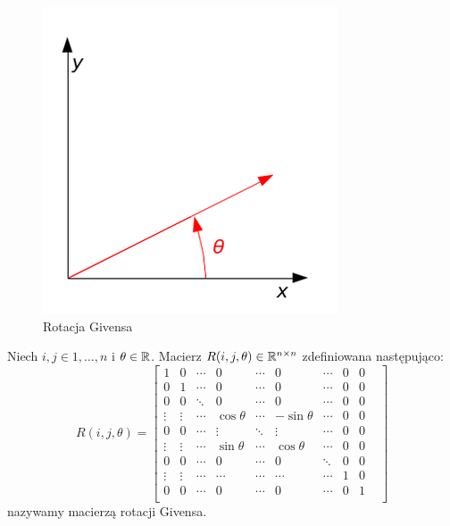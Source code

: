 \documentclass[12pt,a4paper]{report}
\newcommand{\mx}[1]{{#1}}
\begin{document}
\begin{figure}
\centering
\includegraphics[width=\linewidth]{rys/givens_rot.png}
\caption{Rotacja Givensa}\label{rys:logo:jeden}
\end{figure}

\begin{definition}
Niech $ i,j \in {1, \ldots, n}$ i $\theta \in \mathbb{R}$. Macierz $\mx{R}(i,j,\theta) \in \setR^{n\times n}$ zdefiniowana następująco:
$$
\mx{R}(i,j,\theta) = \begin{bmatrix}
1       & 0     & \cdots &    0       & \cdots &    0       & \cdots & 0 & 0& \\
0       & 1     & \cdots &     0      & \cdots &     0      &  \cdots& 0 & 0 &   \\
0       & 0     & \ddots &     0      &  \cdots&     0      &  \cdots& 0 & 0 &  \\
\vdots  &\vdots &  \cdots& \cos\theta & \cdots & -\sin\theta&  \cdots& 0 & 0& \\
0       &  0    & \cdots & \vdots     &  \ddots&  \vdots    & \cdots & 0 & 0& \\
\vdots  & \vdots& \cdots & \sin\theta & \cdots & \cos\theta &  \cdots& 0 & 0& \\
0       & 0     & \cdots &    0       &  \cdots&  0         & \ddots &  0& 0& \\
\vdots  & \vdots&\cdots  &  \cdots    &  \cdots&  \cdots    & \cdots & 1 & 0&\\
0       & 0     & \cdots &     0      &  \cdots&    0       &  \cdots& 0 & 1 & \\       
\end{bmatrix}
$$
nazywamy macierzą rotacji Givensa.
\end{definition}
\end{document}
